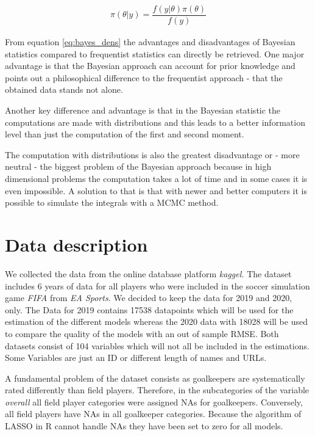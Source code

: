 \documentclass[12pt,a4paper]{article}
\begin{document}
\begin{align}
\label{eq:bayes_dens}
  \pi (\theta | y) = \dfrac{f(y | \theta) \pi(\theta)}{f(y)}
\end{align}

From equation \eqref{eq:bayes_dens} the advantages and disadvantages of
Bayesian statistics compared to frequentist statistics can directly be
retrieved. One major advantage is that the Bayesian approach can account
for prior knowledge and points out a philosophical difference to the
frequentist approach - that the obtained data stands not alone.

Another key difference and advantage is that in the Bayesian statistic
the computations are made with distributions and this leads to a better
information level than just the computation of the first and second
moment.

The computation with distributions is also the greatest disadvantage or
- more neutral - the biggest problem of the Bayesian approach because in
high dimensional problems the computation takes a lot of time and in
some cases it is even impossible. A solution to that is that with newer
and better computers it is possible to simulate the integrals with a
\ac{MCMC} method. \autocite[p.~35 ff.]{ghosh_introduction_2006}

\newpage

\hypertarget{data-description}{%
\section{Data description}\label{data-description}}

We collected the data from the online database platform \emph{kaggel.}
The dataset includes 6 years of data for all players who were included
in the soccer simulation game \emph{FIFA} from \emph{EA Sports}. We
decided to keep the data for 2019 and 2020, only. The Data for 2019
contains 17538 datapoints which will be used for the estimation of the
different models whereas the 2020 data with 18028 will be used to
compare the quality of the models with an out of sample \ac{RMSE}. Both
datasets consist of 104 variables which will not all be included in the
estimations. Some Variables are just an ID or different length of names
and URLs. \autocite{leone_fifa_2020}

A fundamental problem of the dataset consists as goalkeepers are
systematically rated differently than field players. Therefore, in the
subcategories of the variable \emph{overall} all field player categories
were assigned NAs for goalkeepers. Conversely, all field players have
NAs in all goalkeeper categories. Because the algorithm of \ac{LASSO} in
R cannot handle NAs they have been set to zero for all models.
\end{document}
